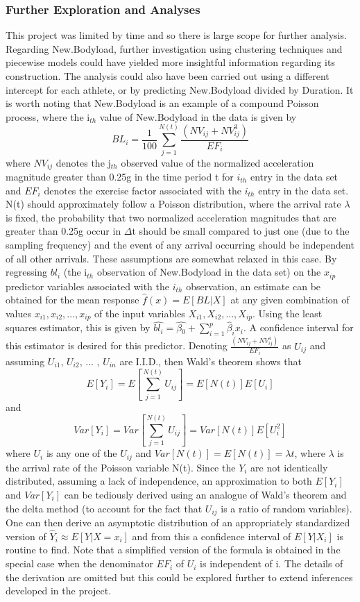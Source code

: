 \subsubsection{Further Exploration and Analyses}
This project was limited by time and so there is large scope for further analysis. Regarding New.Bodyload, further investigation using clustering techniques and piecewise models could have yielded more insightful information regarding its construction. The analysis could also have been carried out using a different intercept for each athlete, or by predicting New.Bodyload divided by Duration. It is worth noting that New.Bodyload is an example of a compound Poisson process, where the i$_{th}$ value of New.Bodyload in the data is given by
\[BL_i=\frac{1}{100}\sum_{j=1}^{N(t)} \frac{{(NV_{ij}+NV_{ij}^3)}}{EF_i} \]
where $NV_{ij}$ denotes the j$_{th}$ observed value of the normalized acceleration magnitude greater than 0.25g in the time period t for $i_{th}$ entry in the data set and $EF_i$ denotes the exercise factor associated with the $i_{th}$ entry in the data set. N(t) should approximately follow a Poisson distribution, where the arrival rate $\lambda$ is fixed, the probability that two normalized acceleration magnitudes that are greater than 0.25g occur in $\Delta$t should be small compared to just one (due to the sampling frequency) and the event of any arrival occurring should be independent of all other arrivals. These assumptions are somewhat relaxed in this case. 
\hfill\break
\newline
By regressing $bl_i$ (the i$_{th}$ observation of New.Bodyload in the data set) on the $x_{ip}$ predictor variables associated with the $i_{th}$ observation, an estimate can be obtained for the mean response $\hat f(x)=E[BL|X]$ at any given combination of values $x_{i1}, x_{i2}, ... , x_{ip}$ of the input variables $X_{i1}, X_{i2}, ... , X_{ip}$. Using the least squares estimator, this is given by $\hat{bl_i} = \hat{\beta{_0}}+\sum_{i=1}^{p}\hat{\beta}_ix_i$. A confidence interval for this estimator is desired for this predictor. Denoting $\frac{{(NV_{ij}+NV_{ij}^3)}}{EF_i}$ as $U_{ij}$ and assuming $U_{i1}$, $U_{i2}$, ... , $U_{in}$ are I.I.D., then Wald's theorem shows that 
\[E[Y_i]=E[\sum_{j=1}^{N(t)}U_{ij}]=E[N(t)]E[U_i]\]
and 
\[Var[Y_i]=Var[\sum_{j=1}^{N(t)}U_{ij}]=Var[N(t)]E[U_i^2]\]
where $U_i$ is any one of the $U_{ij}$ and $Var[N(t)]=E[N(t)]=\lambda t$, where $\lambda$ is the arrival rate of the Poisson variable N(t). Since the $Y_i$ are not identically distributed, assuming a lack of independence, an approximation to both $E[Y_i]$ and $Var[Y_i]$ can be tediously derived using an analogue of Wald's theorem and the delta method (to account for the fact that $U_{ij}$ is a ratio of random variables). One can then derive an asymptotic  distribution of an appropriately standardized version of $\hat Y_i\approx E[Y|X=x_i]$ and from this a confidence interval of $E[Y|X_i]$ is routine to find. Note that a simplified version of the formula is obtained in the special case when the denominator $EF_i$ of $U_i$ is independent of i. The details of the derivation are omitted but this could be explored further to extend inferences developed in the project.


